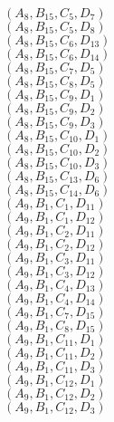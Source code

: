 \documentclass[14pt]{article}
\begin{document}
    $({A}_{8}, {B}_{15}, {C}_{5}, {D}_{7}) $ \\ 
    $({A}_{8}, {B}_{15}, {C}_{5}, {D}_{8}) $ \\ 
    $({A}_{8}, {B}_{15}, {C}_{6}, {D}_{13}) $ \\ 
    $({A}_{8}, {B}_{15}, {C}_{6}, {D}_{14}) $ \\ 
    $({A}_{8}, {B}_{15}, {C}_{7}, {D}_{5}) $ \\ 
    $({A}_{8}, {B}_{15}, {C}_{8}, {D}_{5}) $ \\ 
    $({A}_{8}, {B}_{15}, {C}_{9}, {D}_{1}) $ \\ 
    $({A}_{8}, {B}_{15}, {C}_{9}, {D}_{2}) $ \\ 
    $({A}_{8}, {B}_{15}, {C}_{9}, {D}_{3}) $ \\ 
    $({A}_{8}, {B}_{15}, {C}_{10}, {D}_{1}) $ \\ 
    $({A}_{8}, {B}_{15}, {C}_{10}, {D}_{2}) $ \\ 
    $({A}_{8}, {B}_{15}, {C}_{10}, {D}_{3}) $ \\ 
    $({A}_{8}, {B}_{15}, {C}_{13}, {D}_{6}) $ \\ 
    $({A}_{8}, {B}_{15}, {C}_{14}, {D}_{6}) $ \\ 
    $({A}_{9}, {B}_{1}, {C}_{1}, {D}_{11}) $ \\ 
    $({A}_{9}, {B}_{1}, {C}_{1}, {D}_{12}) $ \\ 
    $({A}_{9}, {B}_{1}, {C}_{2}, {D}_{11}) $ \\ 
    $({A}_{9}, {B}_{1}, {C}_{2}, {D}_{12}) $ \\ 
    $({A}_{9}, {B}_{1}, {C}_{3}, {D}_{11}) $ \\ 
    $({A}_{9}, {B}_{1}, {C}_{3}, {D}_{12}) $ \\ 
    $({A}_{9}, {B}_{1}, {C}_{4}, {D}_{13}) $ \\ 
    $({A}_{9}, {B}_{1}, {C}_{4}, {D}_{14}) $ \\ 
    $({A}_{9}, {B}_{1}, {C}_{7}, {D}_{15}) $ \\ 
    $({A}_{9}, {B}_{1}, {C}_{8}, {D}_{15}) $ \\ 
    $({A}_{9}, {B}_{1}, {C}_{11}, {D}_{1}) $ \\ 
    $({A}_{9}, {B}_{1}, {C}_{11}, {D}_{2}) $ \\ 
    $({A}_{9}, {B}_{1}, {C}_{11}, {D}_{3}) $ \\ 
    $({A}_{9}, {B}_{1}, {C}_{12}, {D}_{1}) $ \\ 
    $({A}_{9}, {B}_{1}, {C}_{12}, {D}_{2}) $ \\ 
    $({A}_{9}, {B}_{1}, {C}_{12}, {D}_{3}) $ \\ 
\end{document}
